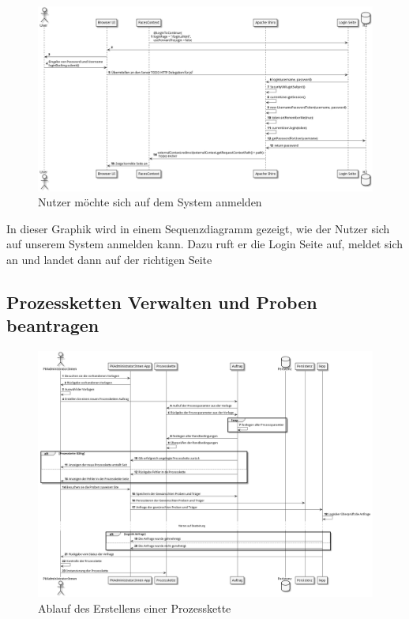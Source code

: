 \documentclass[enabledeprecatedfontcommands,fontsize=12pt,paper=a4,twoside]{scrartcl}
\begin{document}
{\begin{figure}[H]
  \includegraphics[width=\linewidth]{UML/erstbenutzung.png}
  \caption{Nutzer möchte sich auf dem System anmelden}
  \label{fig:pkErstellen}
\end{figure}
In dieser Graphik wird in einem Sequenzdiagramm gezeigt, wie der Nutzer sich auf unserem System anmelden kann. Dazu ruft er die Login Seite auf, meldet sich an und landet dann auf der richtigen Seite

\subsection{Prozessketten Verwalten und Proben beantragen}

\begin{figure}[H]
  \includegraphics[width=\linewidth]{UML/pkErstellen.png}
  \caption{Ablauf des Erstellens einer Prozesskette}
  \label{fig:pkErstellen}
\end{figure}

}
\end{document}
